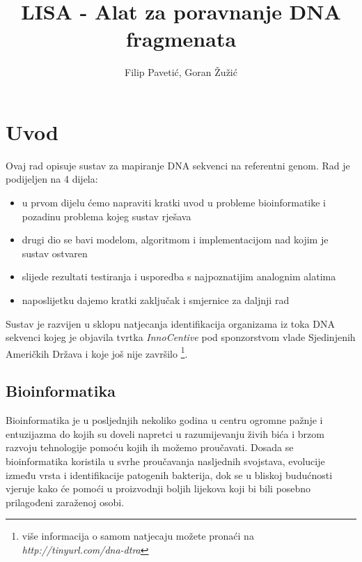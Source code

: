 \documentclass[times, utf8, diplomski]{fer}
\begin{document}
\title{LISA - Alat za poravnanje DNA fragmenata}

\author{Filip Paveti\'{c}, Goran \v{Z}u\v{z}i\'{c}}

\maketitle

\zahvala{}

\tableofcontents

\chapter{Uvod}
Ovaj rad opisuje sustav za mapiranje DNA sekvenci na referentni genom. Rad je podijeljen na 4 dijela:
\begin{itemize}
\item u prvom dijelu ćemo napraviti kratki uvod u probleme bioinformatike i pozadinu problema kojeg sustav rješava
\item drugi dio se bavi modelom, algoritmom i implementacijom nad kojim je sustav ostvaren
\item slijede rezultati testiranja i usporedba s najpoznatijim analognim alatima
\item naposlijetku dajemo kratki zaključak i smjernice za daljnji rad
\end{itemize}

Sustav je razvijen u sklopu natjecanja identifikacija organizama iz toka DNA sekvenci
kojeg je objavila tvrtka \emph{InnoCentive} pod sponzorstvom vlade Sjedinjenih Američkih Država
i koje još nije završilo \footnote{više informacija o samom natjecaju možete pronaći na \emph{http://tinyurl.com/dna-dtra}}.

\section{Bioinformatika}

Bioinformatika je u posljednjih nekoliko godina u centru ogromne pažnje i entuzijazma do kojih su
doveli napretci u razumijevanju živih bića i brzom razvoju tehnologije pomoću kojih ih možemo proučavati.
Dosada se bioinformatika koristila u svrhe proučavanja nasljednih svojstava, evolucije između vrsta i identifikacije
patogenih bakterija, dok se u bliskoj budućnosti vjeruje kako će pomoći u proizvodnji boljih lijekova koji bi bili
posebno prilagođeni zaraženoj osobi.
\end{document}
